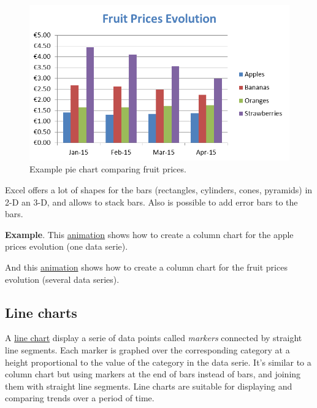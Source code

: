 \begin{figure}[htbp]
\begin{center}
\includegraphics[scale=0.7]{../img/example_chart_column.png}
\end{center}
\caption{Example pie chart comparing fruit prices.}
\label{img-example_chart_column}
\end{figure}

Excel offers a lot of shapes for the bars (rectangles, cylinders, cones, pyramids) in 2-D an 3-D, and allows to stack bars. Also is possible to add error bars to the bars.

\textbf{Example}. This \href{http://aprendeconalf.es/office/excel/manual/img/example_chart_column_one_serie.gif}{animation} shows how to create a column chart for the apple prices evolution (one data serie).

And this \href{http://aprendeconalf.es/office/excel/manual/img/example_chart_column_several_series.gif}{animation} shows how to create a column chart for the fruit prices evolution (several data series).


\subsection{Line charts}\hypertarget{line-charts}{}\label{line-charts}

A \href{https://en.wikipedia.org/wiki/Line\_chart}{line chart} display a serie of data points called \emph{markers} connected by straight line segments. Each marker is graphed over the corresponding category at a height proportional to the value of the category in the data serie. It's similar to a column chart but using markers at the end of bars instead of bars, and joining them with straight line segments. Line charts are suitable for displaying and comparing trends over a period of time.

